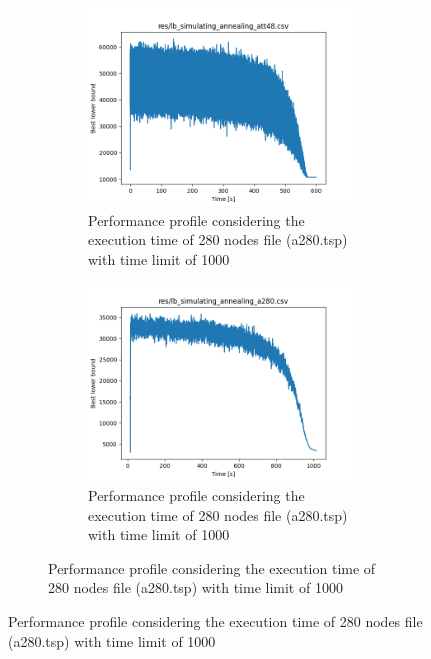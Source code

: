\begin{figure}[!h]
	\begin{subfigure}{.5\columnwidth}
	\centering
	\begin{subfigure}{.49\columnwidth}
		\centering
		\includegraphics[width=\columnwidth]{../res/lb_simulating_annealing_att48.png}
		\caption{Performance profile considering the execution time of 280 nodes file (a280.tsp) with time limit of 1000}
		\label{fig:simultaing_annealing_perform_time}
	\end{subfigure}
	\hfill
	\begin{subfigure}{.49\columnwidth}
		\centering
		\includegraphics[width=\columnwidth]{../res/lb_simulating_annealing_a280.png}
		\caption{Performance profile considering the execution time of 280 nodes file (a280.tsp) with time limit of 1000}

\end{subfigure}
\end{subfigure}
\end{figure}
